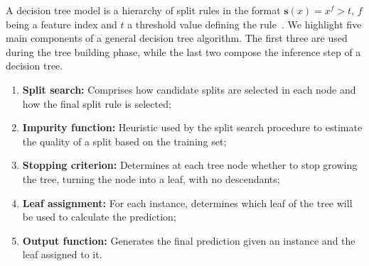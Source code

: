 \documentclass[sn-mathphys-num]{sn-jnl}%
\theoremstyle{thmstyleone}%
\theoremstyle{thmstyletwo}%
\theoremstyle{thmstylethree}%
\begin{document}
A decision tree model is a hierarchy of split rules in the format $\mathbf{s}(x)=x^f>t$,
$f$ being a feature index and $t$ a threshold value defining the rule~\cite{breiman_classification_1984}.
%
We highlight five main components of a general decision tree algorithm. 
%
The first three are used during the tree building phase, while the last two compose the inference step of a decision tree.
%
\begin{enumerate}
    \item \textbf{Split search:} Comprises how candidate splits are selected in each node and how the final split rule is selected; 
    \item \textbf{Impurity function:} Heuristic used by the split search procedure to estimate the quality of a split based on the training set;
    \item \textbf{Stopping criterion:} Determines at each tree node whether to stop growing the tree, turning the node into a leaf, with no descendants;
    \item \textbf{Leaf assignment:} For each instance, determines which leaf of the tree will be used to calculate the prediction;
    \item \textbf{Output function:} Generates the final prediction given an instance and the leaf assigned to it.
\end{enumerate}
\end{document}
